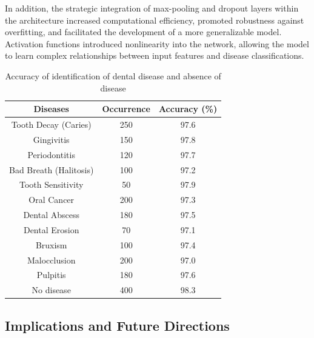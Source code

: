 \documentclass[journal,twoside,web]{ieeecolor}
\begin{document}
In addition, the strategic integration of max-pooling and dropout layers within the architecture increased computational efficiency, promoted robustness against overfitting, and facilitated the development of a more generalizable model. Activation functions introduced nonlinearity into the network, allowing the model to learn complex relationships between input features and disease classifications.

\begin{table}[h]
    \centering
    \begin{tabular}{|c|c|c|}
        \hline
        \textbf{Diseases}      & \textbf{Occurrence} & \textbf{Accuracy (\%)} \\
        \hline
        Tooth Decay (Caries)   & 250                 & 97.6                   \\
        Gingivitis             & 150                 & 97.8                   \\
        Periodontitis          & 120                 & 97.7                   \\
        Bad Breath (Halitosis) & 100                 & 97.2                   \\
        Tooth Sensitivity      & 50                  & 97.9                   \\
        Oral Cancer            & 200                 & 97.3                   \\
        Dental Abscess         & 180                 & 97.5                   \\
        Dental Erosion         & 70                  & 97.1                   \\
        Bruxism                & 100                 & 97.4                   \\
        Malocclusion           & 200                 & 97.0                   \\
        Pulpitis               & 180                 & 97.6                   \\
        No disease             & 400                 & 98.3                   \\
        \hline
    \end{tabular}
    \caption{Accuracy of identification of dental disease and absence of disease}
    \label{tab:dental_diseases}
\end{table}

\subsection{Implications and Future Directions}
\end{document}
